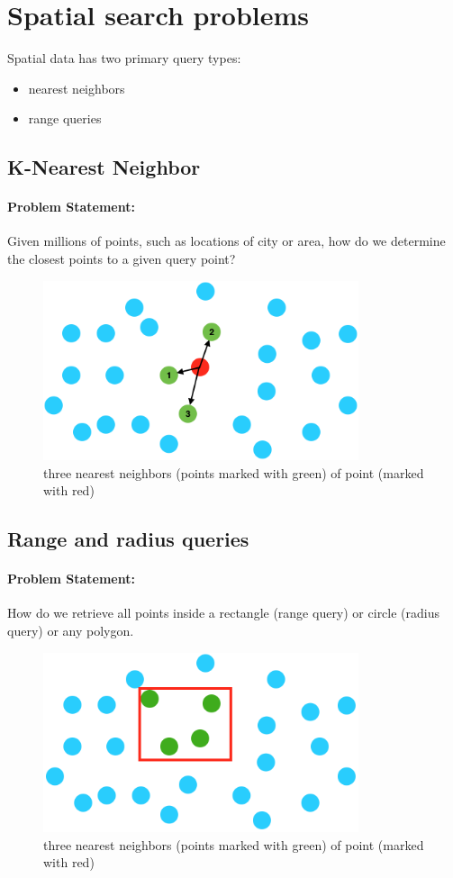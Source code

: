 \documentclass[paper=letter, fontsize=12pt]{article}
\begin{document}
\section{Spatial search problems}
Spatial data has two primary query types: 
\begin{itemize}
	\item nearest neighbors 
	\item range queries
\end{itemize}

\subsection{K-Nearest Neighbor}
\paragraph{Problem Statement:} Given millions of points, such as locations of city or area, how do we determine the closest points to a given query point?
\begin{figure}
	\centering
	\includegraphics[width=350px]{assets/KnearestNeighbour}
	\caption{three nearest neighbors (points marked with green) of point (marked with red)}
\end{figure}

\subsection{Range and radius queries}
\paragraph{Problem Statement:} How do we retrieve all points inside a rectangle (range query) or circle (radius query) or any polygon.
\begin{figure}
	\centering
	\includegraphics[width=350px]{assets/rangeAndRadius}
	\caption{three nearest neighbors (points marked with green) of point (marked with red)}
\end{figure}
\end{document}
